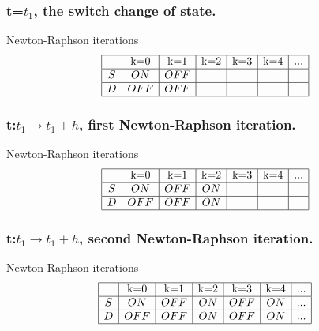 \frame
{

\frametitle{t=$t_1$, the switch change of state.}
  \begin{figure}[!h]
   \centerline{
   \scalebox{0.9}{
    
    }
 } 
 \end{figure}
  \begin{block}{Newton-Raphson iterations}
\begin{equation}
\begin{array}{|c|c|c|c|c|c|c|}
\hline
&$k=0$&$k=1$&$k=2$&$k=3$&$k=4$&...\\
\hline
S&ON&OFF&&&&\\
\hline
D&OFF&OFF&&&&\\
\hline
\end{array}
\end{equation}
\end{block}

 }
  \frame
{

\frametitle{t:$t_1 \to t_1+h$, first Newton-Raphson iteration.}
  \begin{figure}[!h]
   \centerline{
   \scalebox{0.9}{
    
    }
 } 
 \end{figure}
  \begin{block}{Newton-Raphson iterations}
\begin{equation}
\begin{array}{|c|c|c|c|c|c|c|}
\hline
&$k=0$&$k=1$&$k=2$&$k=3$&$k=4$&...\\
\hline
S&ON&OFF&ON&&&\\
\hline
D&OFF&OFF&ON&&&\\
\hline
\end{array}
\end{equation}
\end{block}


 }
  \frame
{

\frametitle{t:$t_1 \to t_1+h$, second Newton-Raphson iteration.}
  \begin{figure}[!h]
   \centerline{
   \scalebox{0.9}{
    
    }
 } 
 \end{figure}
   \begin{block}{Newton-Raphson iterations}
\begin{equation}
\begin{array}{|c|c|c|c|c|c|c|}
\hline
&$k=0$&$k=1$&$k=2$&$k=3$&$k=4$&...\\
\hline
S&ON&OFF&ON&OFF&ON&...\\
\hline
D&OFF&OFF&ON&OFF&ON&...\\
\hline
\end{array}
\end{equation}
\end{block}

 }


